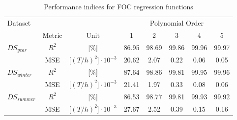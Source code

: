 \begin{table}[h]
    \footnotesize
    \centering
    {\begin{tabular}{ l c c c c c c c }
    \hline
    Dataset & &  & \multicolumn{5}{c}{Polynomial Order}\\
    & Metric & Unit & 1 & 2 & 3 & 4 & 5 \\
    \hline
    $DS_{year}$ & $R^2$ & [$\%$] & 86.95 & 98.69 & 99.86 & 99.96 & 99.97 \\
    &MSE & [$(T/h)^2] \cdot 10^{-3}$ & 20.62 & 2.07 & 0.22 & 0.06 & 0.05 \\   
    $DS_{winter}$ & $R^2$ & [$\%$] & 87.64 & 98.86 & 99.81 & 99.95 & 99.96 \\
    &MSE & [$(T/h)^2] \cdot 10^{-3}$ & 21.41 & 1.97 & 0.33 & 0.08 & 0.06\\
    $DS_{summer}$ & $R^2$ & [$\%$] & 86.53 & 98.77 & 99.81 & 99.93 & 99.92\\
    &MSE & [$(T/h)^2] \cdot 10^{-3}$ & 27.67 & 2.52 & 0.39 & 0.15 & 0.16\\

    \hline
    \end{tabular}}
\caption{Performance indices for FOC regression functions}\label{tbl:polyfit_scores_errors}
\end{table}

